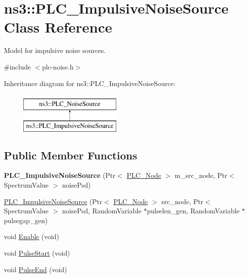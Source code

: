 \hypertarget{classns3_1_1PLC__ImpulsiveNoiseSource}{\section{ns3\-:\-:\-P\-L\-C\-\_\-\-Impulsive\-Noise\-Source \-Class \-Reference}
\label{classns3_1_1PLC__ImpulsiveNoiseSource}
}


\-Model for impulsive noise sources.  




{\ttfamily \#include $<$plc-\/noise.\-h$>$}

\-Inheritance diagram for ns3\-:\-:\-P\-L\-C\-\_\-\-Impulsive\-Noise\-Source\-:\begin{figure}[H]
\begin{center}
\leavevmode
\includegraphics[height=2.000000cm]{classns3_1_1PLC__ImpulsiveNoiseSource}
\end{center}
\end{figure}
\subsection*{\-Public \-Member \-Functions}
\begin{DoxyCompactItemize}
\item 
\hypertarget{classns3_1_1PLC__ImpulsiveNoiseSource_a4c7278ed0a96d2edd86759474fe95524}{{\bfseries \-P\-L\-C\-\_\-\-Impulsive\-Noise\-Source} (\-Ptr$<$ \hyperlink{classns3_1_1PLC__Node}{\-P\-L\-C\-\_\-\-Node} $>$ m\-\_\-src\-\_\-node, \-Ptr$<$ \-Spectrum\-Value $>$ noise\-Psd)}\label{classns3_1_1PLC__ImpulsiveNoiseSource_a4c7278ed0a96d2edd86759474fe95524}

\item 
\hyperlink{classns3_1_1PLC__ImpulsiveNoiseSource_ab62fc890eaf1caa48b74563d9e9a9a7a}{\-P\-L\-C\-\_\-\-Impulsive\-Noise\-Source} (\-Ptr$<$ \hyperlink{classns3_1_1PLC__Node}{\-P\-L\-C\-\_\-\-Node} $>$ src\-\_\-node, \-Ptr$<$ \-Spectrum\-Value $>$ noise\-Psd, \-Random\-Variable $\ast$pulselen\-\_\-gen, \-Random\-Variable $\ast$pulsegap\-\_\-gen)
\item 
void \hyperlink{classns3_1_1PLC__ImpulsiveNoiseSource_ab0f6587b0abb04afcebf6d9a1407a833}{\-Enable} (void)
\item 
void \hyperlink{classns3_1_1PLC__ImpulsiveNoiseSource_a63a45910cd88be1b20ac9875f4a8fe20}{\-Pulse\-Start} (void)
\item 
void \hyperlink{classns3_1_1PLC__ImpulsiveNoiseSource_af90f96c556fc3abff99d1ccee2fd8da6}{\-Pulse\-End} (void)
\end{DoxyCompactItemize}
